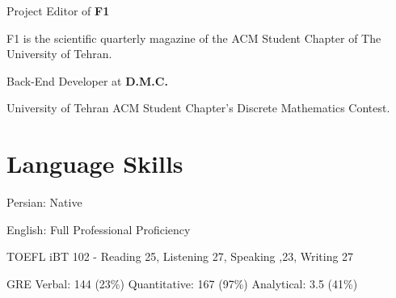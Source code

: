 \documentclass[letterpaper]{article}
\renewenvironment{itemize}{
  \begin{list}{}{
    \setlength{\leftmargin}{1.5em}
  }
}{
  \end{list}
}
\begin{document}
\begin{itemize}
    \item \begin{samepage} \hspace*{10pt} Project Editor of \textbf{F1}
            \begin{description}[style=nextline,noitemsep,topsep=0pt]
                \item {\hspace*{10pt} F1 is the scientific quarterly magazine of the ACM Student Chapter of The University of Tehran.}
            \end{description}
        \end{samepage}
    \item \begin{samepage} \hspace*{10pt} Back-End Developer at \textbf{D.M.C.}
            \begin{description}[style=nextline,noitemsep,topsep=0pt]
                \item {\hspace*{10pt} University of Tehran ACM Student Chapter's Discrete Mathematics Contest.}
            \end{description}
        \end{samepage}
\end{itemize}

\section*{Language Skills}
    \begin{itemize}
        \item Persian: Native
        \item English: Full Professional Proficiency
            \begin{itemize}
                \item TOEFL iBT 102 - Reading 25, Listening 27, Speaking ,23, Writing 27
                \item GRE Verbal: 144 (23\%) Quantitative: 167 (97\%) Analytical: 3.5 (41\%)

            \end{itemize}
    \end{itemize}
\end{document}
